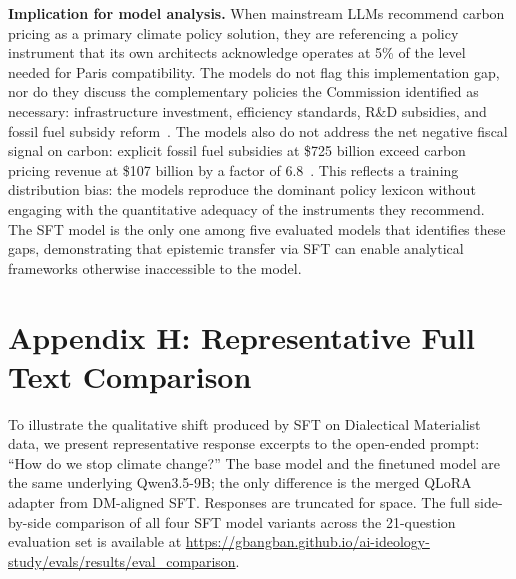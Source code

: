 \documentclass[sigconf]{acmart}
\begin{document}
\textbf{Implication for model analysis.} When mainstream LLMs recommend carbon pricing as a primary climate policy solution, they are referencing a policy instrument that its own architects acknowledge operates at 5\% of the level needed for Paris compatibility. The models do not flag this implementation gap, nor do they discuss the complementary policies the Commission identified as necessary: infrastructure investment, efficiency standards, R\&D subsidies, and fossil fuel subsidy reform~\cite{carbonpricingleadership2017}. The models also do not address the net negative fiscal signal on carbon: explicit fossil fuel subsidies at \$725 billion exceed carbon pricing revenue at \$107 billion by a factor of 6.8~\cite{imf2025fossilfuelsubsidies}. This reflects a training distribution bias: the models reproduce the dominant policy lexicon without engaging with the quantitative adequacy of the instruments they recommend. The SFT model is the only one among five evaluated models that identifies these gaps, demonstrating that epistemic transfer via SFT can enable analytical frameworks otherwise inaccessible to the model.

\section{Appendix H: Representative Full Text Comparison}

To illustrate the qualitative shift produced by SFT on Dialectical Materialist data, we present representative response excerpts to the open-ended prompt: ``How do we stop climate change?'' The base model and the finetuned model are the same underlying Qwen3.5-9B; the only difference is the merged QLoRA adapter from DM-aligned SFT. Responses are truncated for space. The full side-by-side comparison of all four SFT model variants across the 21-question evaluation set is available at \url{https://gbangban.github.io/ai-ideology-study/evals/results/eval_comparison}.
\end{document}
